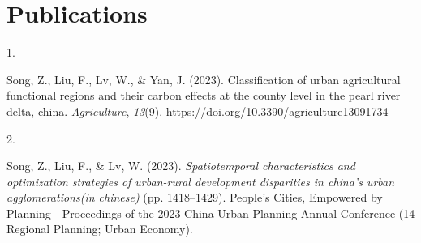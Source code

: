 \documentclass[10pt,a4paper,]{article}
\newlength{\cslhangindent}
\newlength{\csllabelwidth}
\newenvironment{CSLReferences}[2] %
 {\begin{list}{}{%
  \setlength{\itemindent}{0pt}
  \setlength{\leftmargin}{0pt}
  \setlength{\parsep}{0pt}
  \ifodd #1
   \setlength{\leftmargin}{\cslhangindent}
   \setlength{\itemindent}{-1\cslhangindent}
  \fi
  \setlength{\itemsep}{#2\baselineskip}}}
 {\end{list}}
\newcommand{\CSLLeftMargin}[1]{\parbox[t]{\csllabelwidth}{\strut#1\strut}}
\newcommand{\CSLRightInline}[1]{\parbox[t]{\linewidth - \csllabelwidth}{\strut#1\strut}}
\begin{document}
\section{Publications}\label{publications}

\label{refs-4c2bf1a153542c5fe2466e4d798903a3}
\begin{CSLReferences}{0}{0}
\CSLLeftMargin{1. }%
\CSLRightInline{Song, Z., Liu, F., Lv, W., \& Yan, J. (2023).
Classification of urban agricultural functional regions and their carbon
effects at the county level in the pearl river delta, china.
\emph{Agriculture}, \emph{13}(9).
\url{https://doi.org/10.3390/agriculture13091734}}

\CSLLeftMargin{2. }%
\CSLRightInline{Song, Z., Liu, F., \& Lv, W. (2023).
\emph{Spatiotemporal characteristics and optimization strategies of
urban-rural development disparities in china's urban agglomerations(in
chinese)} (pp. 1418--1429). People's Cities, Empowered by Planning -
Proceedings of the 2023 China Urban Planning Annual Conference (14
Regional Planning; Urban Economy).}

\end{CSLReferences}
\end{document}
